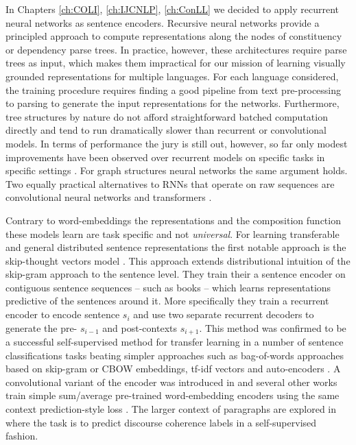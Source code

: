 In Chapters \ref{ch:COLI}, \ref{ch:IJCNLP}, \ref{ch:ConLL} we decided to apply
recurrent neural networks as sentence encoders.
Recursive neural networks provide a principled approach to
compute representations along the nodes of constituency
\citep{socher2013recursive} or dependency \citep{socher2014grounded} parse trees.
In practice, however, these architectures require parse trees as input,
which makes them impractical for our mission of learning visually grounded
representations for multiple languages.
For each language considered, the training procedure requires finding a good
pipeline from text pre-processing to parsing to generate the input representations
for the networks. Furthermore, tree structures by nature do not
afford straightforward batched computation directly and tend to run dramatically
slower than recurrent or convolutional models. In terms of performance the jury
is still out, however, so far only modest improvements have been observed
over recurrent models on specific tasks in specific settings
\citep{li2015tree,tai2015improved}. For graph structures neural networks the
same argument holds. Two equally practical alternatives to RNNs
that operate on raw sequences are convolutional neural networks
\citep{bai2018empirical} and transformers \citep{vaswani2017attention}.


Contrary to word-embeddings the representations
and the composition function these models learn are task specific and not \emph{universal}.
For learning transferable and general distributed sentence representations the first notable approach is the
skip-thought vectors model \citep{kiros2015skip}.
This approach extends distributional intuition of the skip-gram approach to the sentence level.
They train their a sentence encoder on contiguous sentence sequences
-- such as books -- which learns representations predictive of the sentences around it.
More specifically
they train a recurrent encoder to encode sentence $s_i$ and use two separate recurrent decoders to
generate the pre- $s_{i-1}$ and post-contexts $s_{i+1}$.
This method was confirmed to be a successful self-supervised method for transfer
learning in a number of sentence
classifications tasks beating simpler approaches such as bag-of-words approaches based on skip-gram
or CBOW embeddings, tf-idf vectors and auto-encoders \citep{hill2016learning}. A convolutional
variant of the encoder was introduced in \cite{gan2016unsupervised} and several other works
train simple sum/average pre-trained word-embedding encoders using the same context prediction-style
loss \citep{kenter2016siamese,hill2016learning}. The larger context of paragraphs are
explored in \cite{jernite2017discourse} where the task is to predict discourse coherence
labels in a self-supervised fashion.

